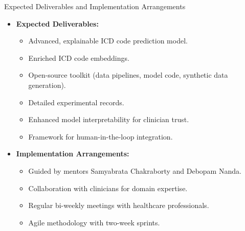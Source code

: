 \documentclass{beamer}
\begin{document}
\begin{frame}{Expected Deliverables and Implementation Arrangements}
    \begin{itemize}
        \item \textbf{Expected Deliverables:}
        \begin{itemize}
            \item Advanced, explainable ICD code prediction model.
            \item Enriched ICD code embeddings.
            \item Open-source toolkit (data pipelines, model code, synthetic data generation).
            \item Detailed experimental records.
            \item Enhanced model interpretability for clinician trust.
            \item Framework for human-in-the-loop integration.
        \end{itemize}
        \item \textbf{Implementation Arrangements:}
        \begin{itemize}
            \item Guided by mentors Samyabrata Chakraborty and Debopam Nanda.
            \item Collaboration with clinicians for domain expertise.
            \item Regular bi-weekly meetings with healthcare professionals.
            \item Agile methodology with two-week sprints.
        \end{itemize}
    \end{itemize}
\end{frame}
\end{document}
